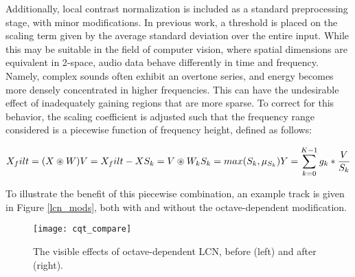 Additionally, local contrast normalization is included as a standard preprocessing stage, with minor modifications.
In previous work, a threshold is placed on the scaling term given by the average standard deviation over the entire input.
While this may be suitable in the field of computer vision, where spatial dimensions are equivalent in 2-space, audio data behave differently in time and frequency.
Namely, complex sounds often exhibit an overtone series, and energy becomes more densely concentrated in higher frequencies.
This can have the undesirable effect of inadequately gaining regions that are more sparse.
To correct for this behavior, the scaling coefficient is adjusted such that the frequency range considered is a piecewise function of frequency height, defined as follows:

\begin{equation}
X_filt = (X \circledast W) \\
V = X_filt - X \\
S_k = V \circledast W_k \\
S_k = max(S_k, \mu_{S_k}) \\
Y = \sum_{k=0}^{K-1} g_k * \frac{V}{S_k} \\
\end{equation}

\noindent To illustrate the benefit of this piecewise combination, an example track is given in Figure \ref{lcn_mods}, both with and without the octave-dependent modification.

\begin{figure}[!t]
\centering
\texttt{[image: cqt\_compare]}
\caption{The visible effects of octave-dependent LCN, before (left) and after (right).}
\label{fig:lcn_mods}
\end{figure}


